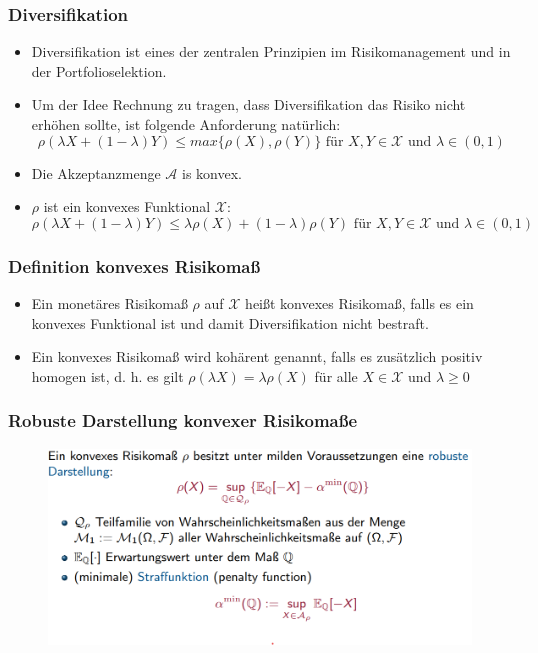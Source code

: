 \documentclass[12pt]{report}
\theoremstyle{dotless}
\theoremstyle{definition}
\begin{document}
\subsubsection{Diversifikation}
\begin{itemize}
\item Diversifikation ist eines der zentralen Prinzipien im Risikomanagement und in
der Portfolioselektion.
\item Um der Idee Rechnung zu tragen, dass Diversifikation das Risiko nicht
erhöhen sollte, ist folgende Anforderung natürlich:
\begin{equation}
\rho(\lambda X + (1-\lambda)Y) \leq max \{ \rho(X), \rho(Y)\} \text{ für } X,Y \in \mathcal{X} \text{ und } \lambda\in (0,1)
\end{equation}
\item Die Akzeptanzmenge $\mathcal{A}$ is konvex.
\item $\rho$ ist ein konvexes Funktional $\mathcal{X}$:
\begin{equation}
\rho(\lambda X + (1-\lambda ) Y ) \leq \lambda\rho (X) + (1-\lambda) \rho(Y) \text{ für } X,Y \in \mathcal{X} \text{ und } \lambda\in (0,1)
\end{equation}
\end{itemize}


\subsubsection{Definition konvexes Risikomaß}
\begin{itemize}
\item Ein monetäres Risikomaß $\rho$ auf $\mathcal{X}$ heißt konvexes Risikomaß, falls es ein konvexes Funktional ist und damit Diversifikation nicht bestraft.
\item Ein konvexes Risikomaß wird kohärent genannt, falls es zusätzlich positiv
homogen ist, d. h. es gilt $\rho(\lambda X) = \lambda\rho(X)$ für alle $X \in \mathcal{X}$ und $\lambda\geq 0$
\end{itemize}


\subsubsection{Robuste Darstellung konvexer Risikomaße}

\begin{figure}[ht]
	\centering
	\includegraphics[width=0.9 \textwidth]{Bilder/robust.png}
\end{figure}
\end{document}
